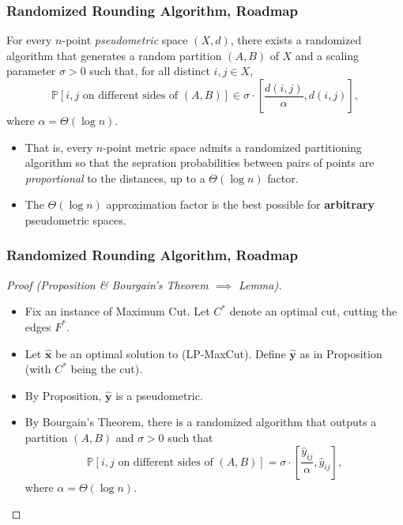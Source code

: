 \documentclass{beamer}
\newcommand{\PP}{\mathbb{P}}
\begin{document}
    \begin{frame}
        \frametitle{Randomized Rounding Algorithm, Roadmap}
    
        \begin{theorem}
            For every $n$-point \emph{pseudometric} space $(X, d)$, there exists a randomized algorithm that generates a random partition $(A, B)$ of $X$ and a scaling parameter $\sigma > 0$ such that, for all distinct $i, j \in X$,
            $$ \PP[\text{$i, j$ on different sides of $(A, B)$}] \in \sigma \cdot \left[\frac{d(i, j)}{\alpha}, d(i, j)\right], $$
            where $\alpha = \Theta(\log n)$.
        \end{theorem}

        \pause

        \begin{itemize}
            \item That is, every $n$-point metric space admits a randomized partitioning algorithm so that the sepration probabilities between pairs of points are \emph{proportional} to the distances, up to a $\Theta(\log n)$ factor. \pause
            \item The $\Theta(\log n)$ approximation factor is the best possible for {\bf arbitrary} pseudometric spaces.
        \end{itemize}
    \end{frame}

    \begin{frame}
        \frametitle{Randomized Rounding Algorithm, Roadmap}
    
        \begin{proof}[Proof (Proposition \& Bourgain's Theorem $\implies$ Lemma)]
            \renewcommand{\qedsymbol}{}
            \begin{itemize}
                \item Fix an instance of {\sc Maximum Cut}. Let $C^*$ denote an optimal cut, cutting the edges $F^*$. \pause
                \item Let $\mathbf{\hat x}$ be an optimal solution to {\sc (LP-MaxCut)}. Define $\mathbf{\hat y}$ as in Proposition (with $C^*$ being the cut). \pause
                \item By Proposition, $\mathbf{\hat y}$ is a pseudometric. \pause
                \item By Bourgain's Theorem, there is a randomized algorithm that outputs a partition $(A, B)$ and $\sigma > 0$ such that
                $$ \PP[\text{$i, j$ on different sides of $(A, B)$}] = \sigma \cdot \left[\frac{\hat y_{ij}}{\alpha}, \hat y_{ij}\right], $$
                where $\alpha = \Theta(\log n)$.
            \end{itemize}
        \end{proof}
    \end{frame}
\end{document}
